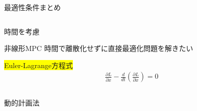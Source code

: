 \documentclass[dvipdfmx,12pt]{beamer}
\begin{document}
\begin{frame}{最適性条件まとめ}
\begin{columns}
            \begin{column}{.55\textwidth}
                \begin{itembox}[l]{時間を考慮}
                    \begin{itembox}[l]{非線形MPC}
                        時間で離散化せずに直接最適化問題を解きたい
                    \end{itembox}
                    \colorbox{yellow}{Euler-Lagrange方程式}\\
                    \begin{align*}
                        \frac{\partial L}{\partial x} - \frac{d}{dt} \left( \frac{\partial L}{\partial \dot{x}} \right) = 0
                    \end{align*}
                    \begin{columns}
                        \begin{column}{.5\textwidth}
                            \begin{center}
                                \begin{itembox}[l]{動的計画法}
                                \end{itembox}
                            \end{center}
                        \end{column}
                        \begin{column}{.5\textwidth}
                        \end{column}
                    \end{columns}
                    
                \end{itembox}
            \end{column}
        \end{columns}
    \end{frame}
\end{document}
